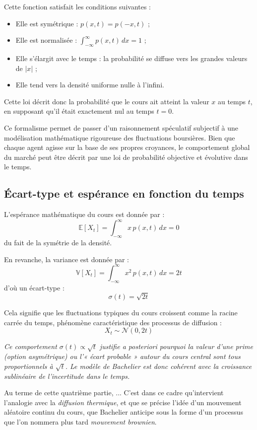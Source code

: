 \documentclass[12pt,a4paper]{article}
\begin{document}
Cette fonction satisfait les conditions suivantes :
\begin{itemize}
    \item Elle est symétrique : $p(x,t) = p(-x,t)$ ;
    \item Elle est normalisée : $\int_{-\infty}^{\infty} p(x,t)\, dx = 1$ ;
    \item Elle s’élargit avec le temps : la probabilité se diffuse vers les grandes valeurs de $|x|$ ;
    \item Elle tend vers la densité uniforme nulle à l’infini.
\end{itemize}

Cette loi décrit donc la probabilité que le cours ait atteint la valeur $x$ au temps $t$, en supposant qu’il était exactement nul au temps $t = 0$.

Ce formalisme permet de passer d’un raisonnement spéculatif subjectif à une modélisation mathématique rigoureuse des fluctuations boursières. Bien que chaque agent agisse sur la base de ses propres croyances, le comportement global du marché peut être décrit par une loi de probabilité objective et évolutive dans le temps.

\subsection{Écart-type et espérance en fonction du temps}

L’espérance mathématique du cours est donnée par :
\[
\mathbb{E}[X_t] = \int_{-\infty}^{\infty} x\, p(x,t)\, dx = 0
\]
du fait de la symétrie de la densité.

En revanche, la variance est donnée par :
\[
\mathbb{V}[X_t] = \int_{-\infty}^{\infty} x^2\, p(x,t)\, dx = 2t
\]
d’où un écart-type :
\[
\sigma(t) = \sqrt{2t}
\]

Cela signifie que les fluctuations typiques du cours croissent comme la racine carrée du temps, phénomène caractéristique des processus de diffusion :
\[
X_t \sim \mathcal{N}(0, 2t)
\]

\textit{
Ce comportement $\sigma(t) \propto \sqrt{t}$ justifie a posteriori pourquoi la valeur d’une prime (option asymétrique) ou l’« écart probable » autour du cours central sont tous proportionnels à $\sqrt{t}$. Le modèle de Bachelier est donc cohérent avec la croissance sublinéaire de l’incertitude dans le temps.
}

Au terme de cette quatrième partie, ...
C’est dans ce cadre qu’intervient l’analogie avec la \textit{diffusion thermique}, et que se précise l’idée d’un mouvement aléatoire continu du cours, que Bachelier anticipe sous la forme d’un processus que l’on nommera plus tard \textit{mouvement brownien}.
\end{document}
